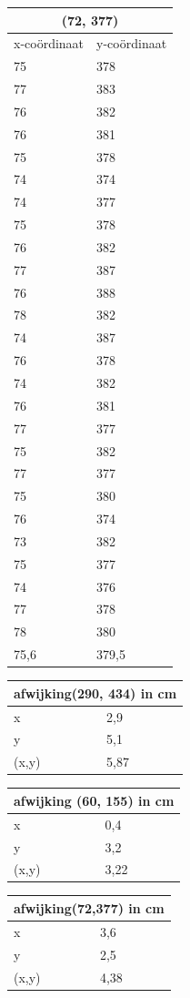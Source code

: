 \documentclass{article}
\begin{document}
\begin{tabular}{ |l|l| }
  \hline
  \multicolumn{2}{|c|}{(72, 377)} \\
  \hline
  x-co\"ordinaat & y-co\"ordinaat \\ \hline
     75 & 378\\ \hline
     77 & 383\\ \hline
     76 & 382\\ \hline
     76 & 381\\ \hline
     75 & 378\\ \hline
     74 & 374\\ \hline
     74 & 377\\ \hline
     75 & 378\\ \hline
     76 & 382\\ \hline
     77 & 387\\ \hline
     76 & 388\\ \hline
     78 & 382\\ \hline
     74 & 387\\ \hline
     76 & 378\\ \hline
     74 & 382\\ \hline
     76 & 381\\ \hline
     77 & 377\\ \hline
     75 & 382\\ \hline
     77 & 377\\ \hline
     75 & 380\\ \hline
     76 & 374\\ \hline
     73 & 382\\ \hline
     75 & 377\\ \hline
     74 & 376\\ \hline
     77 & 378\\ \hline
     78 & 380\\ \hline\hline
     75,6 & 379,5 \\ \hline 
\end{tabular}
\newline
\begin{tabular}{ |l|p{}| }
  \hline
  \multicolumn{2}{|c|}{afwijking(290, 434) in cm} \\
  \hline
  x & 2,9 \\ \hline
  y & 5,1 \\ \hline
  (x,y) & 5,87 \\ \hline
\end{tabular}
\begin{tabular}{ |l|p{}| }
  \hline
  \multicolumn{2}{|c|}{afwijking (60, 155) in cm} \\
  \hline
  x & 0,4 \\ \hline
  y & 3,2 \\ \hline
  (x,y) & 3,22 \\ \hline
\end{tabular}
\begin{tabular}{ |l|p{}| }
  \hline
  \multicolumn{2}{|c|}{afwijking(72,377) in cm} \\
  \hline
  x & 3,6 \\ \hline
  y & 2,5 \\ \hline
  (x,y) & 4,38 \\ \hline
\end{tabular}
\end{document}
